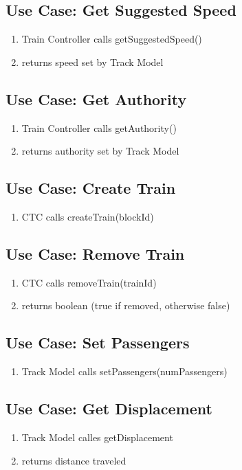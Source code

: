 \documentclass{scrreprt}
\begin{document}
\subsection{Use Case: Get Suggested Speed}
\begin{enumerate}
	\item Train Controller calls getSuggestedSpeed()
	\item returns speed set by Track Model
\end{enumerate}

\subsection{Use Case: Get Authority}
\begin{enumerate}
	\item Train Controller calls getAuthority()
	\item returns authority set by Track Model
\end{enumerate}

\subsection{Use Case: Create Train}
\begin{enumerate}
	\item CTC calls createTrain(blockId)
\end{enumerate}

\subsection{Use Case: Remove Train}
\begin{enumerate}
	\item CTC calls removeTrain(trainId)
	\item returns boolean (true if removed, otherwise false)
\end{enumerate}

\subsection{Use Case: Set Passengers}
\begin{enumerate}
	\item Track Model calls setPassengers(numPassengers)
\end{enumerate}

\subsection{Use Case: Get Displacement}
\begin{enumerate}
	\item Track Model calles getDisplacement
	\item returns distance traveled
\end{enumerate}
\end{document}
